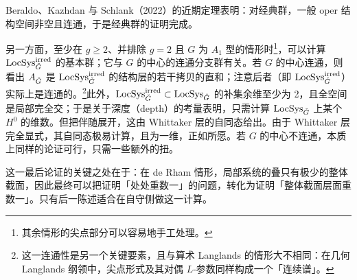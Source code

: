 Beraldo、Kazhdan 与 Schlank（2022）的近期定理表明：对经典群，一般 oper 结构空间非空且连通，于是经典群的证明完成。

另一方面，至少在 $g\ge 2$、并排除 $g=2$ 且 $G$ 为 $A_1$ 型的情形时\footnote{其余情形的尖点部分可以容易地手工处理。}，可以计算 $\operatorname{LocSys}^{\mathrm{irred}}_{\check{G}}$ 的基本群；它与 $G$ 的中心的连通分支群有关。若 $G$ 的中心连通，则看出 $A_{\check{G}}$ 是 $\operatorname{LocSys}^{\mathrm{irred}}_{\check{G}}$ 的结构层的若干拷贝的直和；注意后者（即 $\operatorname{LocSys}^{\mathrm{irred}}_{\check{G}}$）实际上是连通的。\footnote{这一连通性是另一个关键要素，且与算术 Langlands 的情形大不相同：在几何 Langlands 纲领中，尖点形式及其对偶 $L$-参数同样构成一个「连续谱」。}此外，$\operatorname{LocSys}^{\mathrm{irred}}_{\check{G}}\subset\operatorname{LocSys}_{\check{G}}$ 的补集余维至少为 2，且全空间是局部完全交；于是关于深度（depth）的考量表明，只需计算 $\operatorname{LocSys}_{\check{G}}$ 上某个 $H^0$ 的维数。但把伴随展开，这由 Whittaker 层的自同态给出。由于 Whittaker 层完全显式，其自同态极易计算，且为一维，正如所愿。若 $G$ 的中心不连通，本质上同样的论证可行，只需一些额外的扭。

\begin{remark}
这一最后论证的关键之处在于：在 de Rham 情形，局部系统的叠只有极少的整体截面，因此最终可以把证明「处处重数一」的问题，转化为证明「整体截面层面重数一」。只有后一陈述适合在自守侧做这一计算。
\end{remark}

\emergencystretch=0pt